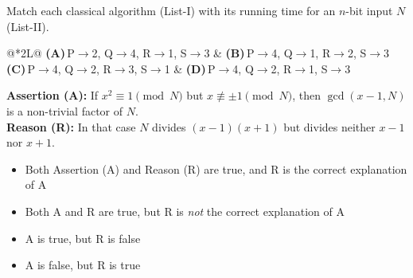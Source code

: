 \documentclass[11pt,a4paper]{article}
\newcommand{\optlabel}[1]{\textbf{(#1)}}
\newenvironment{qitem}[1]{\begin{list}{}{\setlength{\leftmargin}{3.3em}\setlength{\labelwidth}{3.1em}%
  \setlength{\labelsep}{0.2em}\setlength{\topsep}{3pt}\setlength{\parsep}{3pt}}\item[\textbf{Q.#1}\hfill]}{\end{list}}
\newcommand{\qsep}{\par\vspace{2pt}{\color{black!15}\hrule}\vspace{4pt}}
\begin{document}
\begin{qitem}{16}
Match each classical algorithm (List-I) with its running time for an $n$-bit input $N$ (List-II).
\par\smallskip{}
\par\smallskip\noindent\begin{tabularx}{\linewidth}{@{}*{2}{L}@{}}
\optlabel{A}\,P$\to$2, Q$\to$4, R$\to$1, S$\to$3 & \optlabel{B}\,P$\to$4, Q$\to$1, R$\to$2, S$\to$3 \\[3pt]
\optlabel{C}\,P$\to$4, Q$\to$2, R$\to$3, S$\to$1 & \optlabel{D}\,P$\to$4, Q$\to$2, R$\to$1, S$\to$3
\end{tabularx}
\end{qitem}
\qsep

\begin{qitem}{17}
\textbf{Assertion (A):} If $x^2 \equiv 1 \pmod N$ but $x \not\equiv \pm1 \pmod N$, then $\gcd(x - 1, N)$ is a non-trivial factor of $N$.\\[1mm]
\textbf{Reason (R):} In that case $N$ divides $(x - 1)(x + 1)$ but divides neither $x - 1$ nor $x + 1$.
\begin{itemize}[leftmargin=2.6em, labelsep=0.4em, itemsep=2pt, topsep=3pt]
\item[\optlabel{A}] Both Assertion (A) and Reason (R) are true, and R is the correct explanation of A
\item[\optlabel{B}] Both A and R are true, but R is \emph{not} the correct explanation of A
\item[\optlabel{C}] A is true, but R is false
\item[\optlabel{D}] A is false, but R is true
\end{itemize}
\end{qitem}
\qsep
\end{document}
